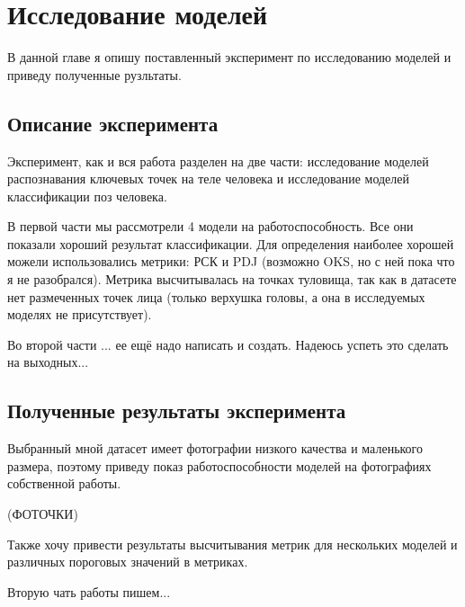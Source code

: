 \section{Исследование моделей}
\label{sec:Chapter4} 

В данной главе я опишу поставленный эксперимент по исследованию моделей и приведу полученные рузльтаты.

\subsection{Описание эксперимента}

Эксперимент, как и вся работа разделен на две части: исследование моделей распознавания ключевых точек на теле человека и исследование моделей классификации поз человека.

В первой части мы рассмотрели 4 модели на работоспособность. Все они показали хороший результат классификации. Для определения наиболее хорошей можели использовались метрики: РСК и PDJ (возможно OKS, но с ней пока что я не разобрался). Метрика высчитывалась на точках туловища, так как в датасете нет размеченных точек лица (только верхушка головы, а она в исследуемых моделях не присутствует).

Во второй части ... ее ещё надо написать и создать. Надеюсь успеть это сделать на выходных...

\subsection{Полученные результаты эксперимента}

Выбранный мной датасет имеет фотографии низкого качества и маленького размера, поэтому приведу показ работоспособности моделей на фотографиях собственной работы. 

(ФОТОЧКИ)

Также хочу привести результаты высчитывания метрик для нескольких моделей и различных пороговых значений в метриках.

Вторую чать работы пишем...

\newpage
